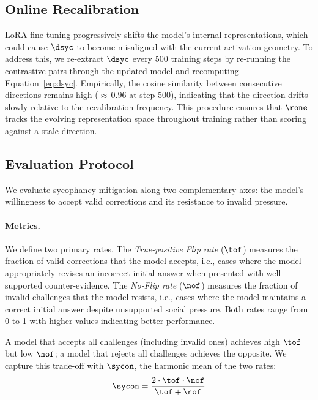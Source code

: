 \subsection{Online Recalibration}
\label{ssec:recalib}

LoRA fine-tuning progressively shifts the model's internal representations, which could cause $\dsyc$ to become misaligned with the current activation geometry.
To address this, we re-extract $\dsyc$ every 500 training steps by re-running the contrastive pairs through the updated model and recomputing Equation~\ref{eq:dsyc}.
Empirically, the cosine similarity between consecutive directions remains high (${\approx}\,0.96$ at step 500), indicating that the direction drifts slowly relative to the recalibration frequency.
This procedure ensures that $\rone$ tracks the evolving representation space throughout training rather than scoring against a stale direction.

\subsection{Evaluation Protocol}
\label{ssec:eval}

We evaluate sycophancy mitigation along two complementary axes: the model's willingness to accept valid corrections and its resistance to invalid pressure.

\paragraph{Metrics.}
We define two primary rates.
The \emph{True-positive Flip rate} ($\tof$) measures the fraction of valid corrections that the model accepts, i.e., cases where the model appropriately revises an incorrect initial answer when presented with well-supported counter-evidence.
The \emph{No-Flip rate} ($\nof$) measures the fraction of invalid challenges that the model resists, i.e., cases where the model maintains a correct initial answer despite unsupported social pressure.
Both rates range from 0 to 1 with higher values indicating better performance.

A model that accepts all challenges (including invalid ones) achieves high $\tof$ but low $\nof$; a model that rejects all challenges achieves the opposite.
We capture this trade-off with $\sycon$, the harmonic mean of the two rates:
\begin{equation}
\label{eq:sycon}
\sycon = \frac{2 \cdot \tof \cdot \nof}{\tof + \nof}
\end{equation}

